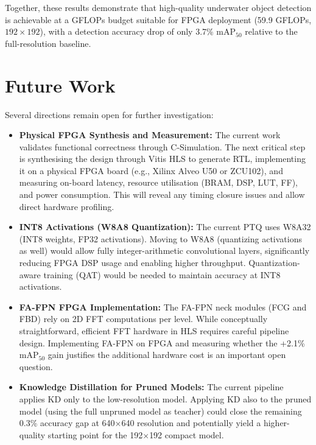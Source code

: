 Together, these results demonstrate that high-quality underwater object detection is achievable at a GFLOPs budget suitable for FPGA deployment (59.9 GFLOPs, $192\times192$), with a detection accuracy drop of only 3.7\% mAP$_{50}$ relative to the full-resolution baseline.

\section{Future Work}

Several directions remain open for further investigation:

\begin{itemize}

    \item \textbf{Physical FPGA Synthesis and Measurement:}
    The current work validates functional correctness through C-Simulation. The next critical step is synthesising the design through Vitis HLS to generate RTL, implementing it on a physical FPGA board (e.g., Xilinx Alveo U50 or ZCU102), and measuring on-board latency, resource utilisation (BRAM, DSP, LUT, FF), and power consumption. This will reveal any timing closure issues and allow direct hardware profiling.

    \item \textbf{INT8 Activations (W8A8 Quantization):}
    The current PTQ uses W8A32 (INT8 weights, FP32 activations). Moving to W8A8 (quantizing activations as well) would allow fully integer-arithmetic convolutional layers, significantly reducing FPGA DSP usage and enabling higher throughput. Quantization-aware training (QAT) would be needed to maintain accuracy at INT8 activations.

    \item \textbf{FA-FPN FPGA Implementation:}
    The FA-FPN neck modules (FCG and FBD) rely on 2D FFT computations per level. While conceptually straightforward, efficient FFT hardware in HLS requires careful pipeline design. Implementing FA-FPN on FPGA and measuring whether the +2.1\% mAP$_{50}$ gain justifies the additional hardware cost is an important open question.

    \item \textbf{Knowledge Distillation for Pruned Models:}
    The current pipeline applies KD only to the low-resolution model. Applying KD also to the pruned model (using the full unpruned model as teacher) could close the remaining 0.3\% accuracy gap at 640$\times$640 resolution and potentially yield a higher-quality starting point for the 192$\times$192 compact model.


\end{itemize}
